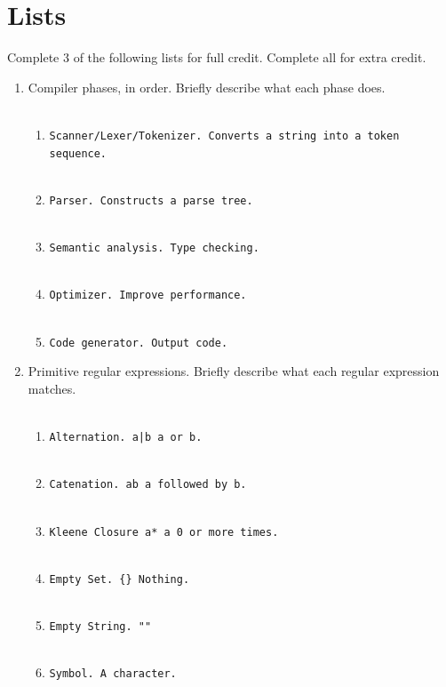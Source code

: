 \documentclass[10pt]{amsart}
\begin{document}
\section{Lists}
Complete 3 of the following lists for full credit. Complete all for extra credit.\\

\begin{enumerate}
\item Compiler phases, in order. Briefly describe what each phase does.\\\\

\begin{enumerate}
\item \verb+Scanner/Lexer/Tokenizer. Converts a string into a token sequence.+\\\\
\item \verb+Parser. Constructs a parse tree.+\\\\
\item \verb+Semantic analysis. Type checking.+\\\\
\item \verb+Optimizer. Improve performance.+\\\\
\item \verb+Code generator. Output code.+\\
\end{enumerate}

\item Primitive regular expressions. Briefly describe what each regular expression matches.\\\\

\begin{enumerate}
\item \verb+Alternation. a|b a or b.+\\\\
\item \verb+Catenation. ab a followed by b.+\\\\
\item \verb+Kleene Closure a* a 0 or more times.+\\\\
\item \verb+Empty Set. {} Nothing.+\\\\
\item \verb+Empty String. ""+\\\\
\item \verb+Symbol. A character.+
\end{enumerate}


\end{enumerate}
\end{document}
